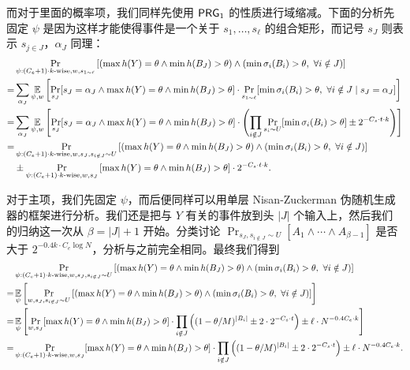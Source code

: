 而对于里面的概率项，我们同样先使用 $\mathsf{PRG}_1$ 的性质进行域缩减。下面的分析先固定 $\psi$ 是因为这样才能使得事件是一个关于 $s_1, \ldots, s_\ell$ 的组合矩形，而记号 $s_J$ 则表示 $s_{j\in J}$，$\alpha_J$ 同理：
\begin{align*}
      & \Pr_{\psi : (C_e + 1) \cdot k\text{-wise}, w, s_{1 \sim \ell}} \left[ (\max h(Y) = \theta \wedge \min h(B_J) > \theta) \wedge (\min \sigma_i(B_i) > \theta,\ \forall i \notin J)  \right] \\
    = & \sum_{\alpha_J} \operatorname*{\mathbb{E}}_{\psi, w} \left[ \Pr_{s_J} [ s_J = \alpha_J \wedge \max h(Y) = \theta \wedge \min h(B_J) > \theta ] \cdot \Pr_{s_{1 \sim \ell}} [\min \sigma_i(B_i) > \theta,\ \forall i \notin J \mid s_J = \alpha_J]  \right] \\
    = & \sum_{\alpha_J} \operatorname*{\mathbb{E}}_{\psi, w} \left[ \Pr_{s_J} [ s_J = \alpha_J \wedge \max h(Y) = \theta \wedge \min h(B_J) > \theta ] \cdot \left( \prod_{i \notin J} \Pr_{s_i \sim U}[\min \sigma_i(B_i) > \theta] \pm 2^{-C_s \cdot t \cdot k} \right) \right] \\
    = & \Pr_{\psi : (C_e + 1) \cdot k\text{-wise}, w, s_J, s_{i \notin J} \sim U}\left[ (\max h(Y) = \theta \wedge \min h(B_J) > \theta) \wedge (\min \sigma_i(B_i) > \theta,\ \forall i \notin J)  \right] \\
      & \pm \Pr_{\psi : (C_e + 1) \cdot k\text{-wise}, w, s_J}\left[ \max h(Y) = \theta \wedge \min h(B_J) > \theta  \right] \cdot 2^{-C_s \cdot t \cdot k}.
\end{align*}

对于主项，我们先固定 $\psi$，而后便同样可以用单层 Nisan-Zuckerman 伪随机生成器的框架进行分析。我们还是把与 $Y$ 有关的事件放到头 $|J|$ 个输入上，然后我们的归纳这一次从 $\beta = |J| + 1$ 开始。分类讨论 $\Pr_{s_J, s_{i \notin J} \sim U}[A_1 \wedge \cdots \wedge A_{\beta - 1}]$ 是否大于 $2^{-0.4 k \cdot C_e \log N}$，分析与之前完全相同。最终我们得到
\begin{align*}
      & \Pr_{\psi : (C_e + 1) \cdot k\text{-wise}, w, s_J, s_{i \notin J} \sim U}\left[ (\max h(Y) = \theta \wedge \min h(B_J) > \theta) \wedge (\min \sigma_i(B_i) > \theta,\ \forall i \notin J)  \right] \\
    = & \operatorname*{\mathbb{E}}_{\psi}\left[ \Pr_{w, s_J, s_{i \notin J} \sim U}\left[ (\max h(Y) = \theta \wedge \min h(B_J) > \theta) \wedge (\min \sigma_i(B_i) > \theta,\ \forall i \notin J) \right] \right] \\
    = & \operatorname*{\mathbb{E}}_{\psi}\left[ \Pr_{w, s_J}[ \max h(Y) = \theta \wedge \min h(B_J) > \theta ] \cdot \prod_{i \notin J} \left( (1 - \theta / M)^{|B_i|} \pm 2 \cdot 2^{-C_s \cdot t} \right) \pm \ell \cdot N^{-0.4 C_e \cdot k} \right] \\
    = & \Pr_{\psi : (C_e + 1) \cdot k\text{-wise}, w, s_J}[ \max h(Y) = \theta \wedge \min h(B_J) > \theta ] \cdot \prod_{i \notin J} \left( (1 - \theta / M)^{|B_i|} \pm 2 \cdot 2^{-C_s \cdot t} \right) \pm \ell \cdot N^{-0.4 C_e \cdot k}.
\end{align*}

